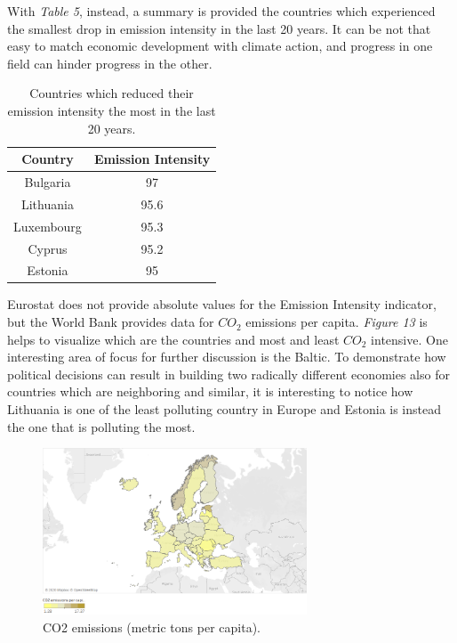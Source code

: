 \documentclass{book}
\begin{document}
With \textit{Table 5}, instead, a summary is provided the countries which experienced the smallest drop in emission intensity in the last 20 years. It can be not that easy to match economic development with climate action, and progress in one field can hinder progress in the other.

\bigskip
\begin{table}[H]
\begin{center}
\begin{tabular}{|c|c|}
\hline
Country & Emission Intensity \\
\hline
Bulgaria & 97\\
Lithuania & 95.6\\
Luxembourg & 95.3\\
Cyprus & 95.2\\
Estonia & 95\\
\hline
\end{tabular}
\caption{Countries which reduced their emission intensity the most in the last 20 years.}
\end{center}
\end{table}

Eurostat does not provide absolute values for the Emission Intensity indicator, but the World Bank provides data for $CO_{2}$ emissions per capita. \textit{Figure 13} is helps to visualize which are the countries and most and least $CO_{2}$ intensive. One interesting area of focus for further discussion is the Baltic. To demonstrate how political decisions can result in building two radically different economies also for countries which are neighboring and similar, it is interesting to notice how Lithuania is one of the least polluting country in Europe and Estonia is instead the one that is polluting the most.

\bigskip
\begin{figure}[H]
\begin{center}
\captionsetup{justification=centering}
\includegraphics[width=0.7\textwidth]{Images/intensiti.png}
\caption{CO2 emissions (metric tons per capita). }
\end{center}
\end{figure}
\bigskip
\end{document}
